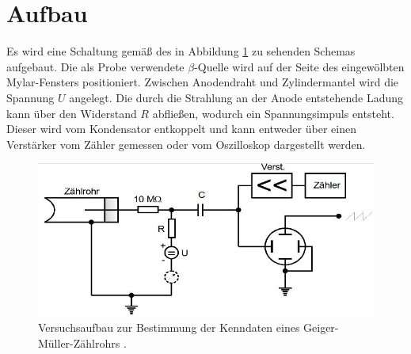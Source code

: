 \section{Aufbau}
\label{sec:Aufbau}
Es wird eine Schaltung gemäß des in Abbildung \ref{fig:Aufbau} zu sehenden Schemas aufgebaut. Die als Probe verwendete $\beta$-Quelle wird auf der Seite des eingewölbten Mylar-Fensters positioniert. Zwischen Anodendraht und Zylindermantel wird die Spannung $U$ angelegt. Die durch die Strahlung an der Anode entstehende Ladung kann über den Widerstand $R$ abfließen, wodurch ein Spannungsimpuls entsteht. Dieser wird vom Kondensator entkoppelt und kann entweder über einen Verstärker vom Zähler gemessen oder vom Oszilloskop dargestellt werden.
\begin{figure}
\centering
\includegraphics[scale=0.5]{content/images/aufbau2.jpg}
\caption{Versuchsaufbau zur Bestimmung der Kenndaten eines Geiger-Müller-Zählrohrs \cite{V703}.}
\label{fig:Aufbau}
\end{figure}
